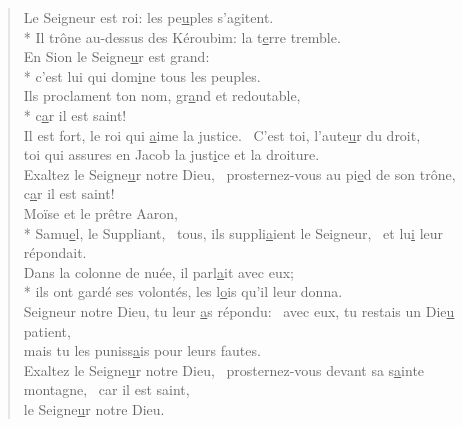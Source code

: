 \begin{verse}
Le Seigneur est roi: les pe\underline{u}ples s’agitent. \\*
Il trône au-dessus des Kéroubim: la t\underline{e}rre tremble. \\

En Sion le Seigne\underline{u}r est grand: \\*
c’est lui qui dom\underline{i}ne tous les peuples. \\

Ils proclament ton nom, gr\underline{a}nd et redoutable, \\*
c\underline{a}r il est saint! \\

Il est fort, le roi qui \underline{a}ime la justice.~\psalmdagger
C’est toi, l’aute\underline{u}r du droit, \\
toi qui assures en Jacob la just\underline{i}ce et la droiture. \\

Exaltez le Seigne\underline{u}r notre Dieu,~\psalmdagger
prosternez-vous au pi\underline{e}d de son trône, \\
c\underline{a}r il est saint! \\

Moïse et le prêtre Aaron, \\*
Samu\underline{e}l, le Suppliant,~\psalmdagger
tous, ils suppli\underline{a}ient le Seigneur,~\psalmstar
et lu\underline{i} leur répondait. \\

Dans la colonne de nuée, il parl\underline{a}it avec eux; \\*
ils ont gardé ses volontés, les l\underline{o}is qu’il leur donna. \\

Seigneur notre Dieu, tu leur \underline{a}s répondu:~\psalmdagger
avec eux, tu restais un Die\underline{u} patient, \\
mais tu les puniss\underline{a}is pour leurs fautes. \\

Exaltez le Seigne\underline{u}r notre Dieu,~\psalmdagger
prosternez-vous devant sa s\underline{a}inte montagne,~\psalmstar
car il est saint, \\
le Seigne\underline{u}r notre Dieu. \\
\end{verse}

